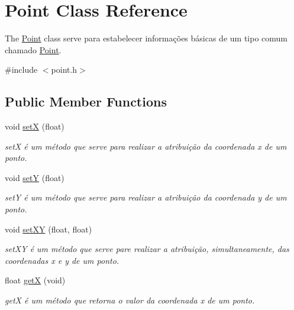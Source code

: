 \hypertarget{classPoint}{}\section{Point Class Reference}
\label{classPoint}


The \hyperlink{classPoint}{Point} class serve para estabelecer informações básicas de um tipo comum chamado \hyperlink{classPoint}{Point}.  




{\ttfamily \#include $<$point.\+h$>$}

\subsection*{Public Member Functions}
\begin{DoxyCompactItemize}
\item 
\mbox{\label{classPoint_a61253b28283b54a9cf379132bdff3006}} 
void \hyperlink{classPoint_a61253b28283b54a9cf379132bdff3006}{setX} (float)
\begin{DoxyCompactList}\small\item\em setX é um método que serve para realizar a atribuição da coordenada x de um ponto. \end{DoxyCompactList}\item 
\mbox{\label{classPoint_a0a9d3529888cd2fd7c0adb8e46702110}} 
void \hyperlink{classPoint_a0a9d3529888cd2fd7c0adb8e46702110}{setY} (float)
\begin{DoxyCompactList}\small\item\em setY é um método que serve para realizar a atribuição da coordenada y de um ponto. \end{DoxyCompactList}\item 
\mbox{\label{classPoint_ae456513d2af9dec336514a94e350a386}} 
void \hyperlink{classPoint_ae456513d2af9dec336514a94e350a386}{set\+XY} (float, float)
\begin{DoxyCompactList}\small\item\em set\+XY é um método que serve pare realizar a atribuição, simultaneamente, das coordenadas x e y de um ponto. \end{DoxyCompactList}\item 
float \hyperlink{classPoint_a9aa94b8fd07296e64d304ef3750db113}{getX} (void)
\begin{DoxyCompactList}\small\item\em getX é um método que retorna o valor da coordenada x de um ponto. \end{DoxyCompactList}\item 

\end{DoxyCompactItemize}
